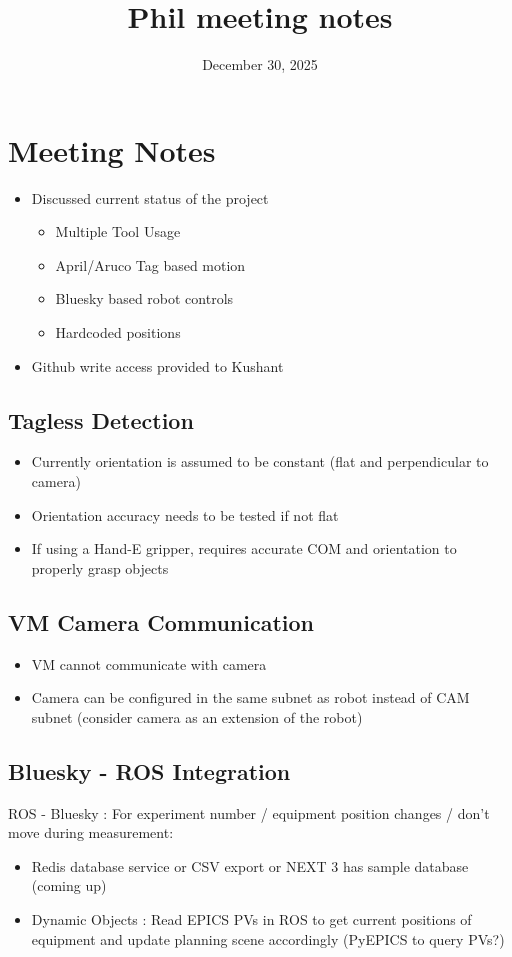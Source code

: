 \documentclass[12pt, a4paper]{article}
\title{Phil meeting notes}
\author{}
\date{December 30, 2025}
\begin{document}
\maketitle

\section*{Meeting Notes}


\begin{itemize}
    \item Discussed current status of the project
    \begin{itemize}
      \item Multiple Tool Usage
      \item April/Aruco Tag based motion
      \item Bluesky based robot controls
      \item Hardcoded positions 
    \end{itemize}
    \item Github write access provided to Kushant
\end{itemize}

\subsection*{Tagless Detection}
\begin{itemize}
    \item Currently orientation is assumed to be constant (flat and perpendicular to camera)
    \item Orientation accuracy needs to be tested if not flat
    \item If using a Hand-E gripper, requires accurate COM and orientation to properly grasp objects
\end{itemize}

\subsection*{VM Camera Communication}
\begin{itemize}
    \item VM cannot communicate with camera
    \item Camera can be configured in the same subnet as robot instead of CAM subnet (consider camera as an extension of the robot)
\end{itemize}

\subsection*{Bluesky - ROS Integration}
ROS - Bluesky : For experiment number / equipment position changes / don't move during measurement:
\begin{itemize}
    \item Redis database service or CSV export or NEXT 3 has sample database (coming up)
    \item Dynamic Objects : Read EPICS PVs in ROS to get current positions of equipment and update planning scene accordingly (PyEPICS to query PVs?)
\end{itemize}
\end{document}

